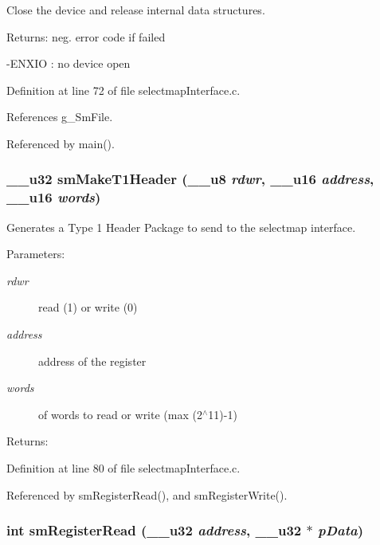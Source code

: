Close the device and release internal data structures. 

\begin{Desc}
\item[Returns:]neg. error code if failed \par
 -ENXIO : no device open \end{Desc}


Definition at line 72 of file selectmap\-Interface.c.

References g\_\-Sm\-File.

Referenced by main().\hypertarget{group__selectmap__access_g88f0784ea00a5707d5fc4db2778e1b2a}{
\subsubsection[smMakeT1Header]{\setlength{\rightskip}{0pt plus 5cm}\_\-\_\-u32 sm\-Make\-T1Header (\_\-\_\-u8 {\em rdwr}, \_\-\_\-u16 {\em address}, \_\-\_\-u16 {\em words})}}
\label{group__selectmap__access_g88f0784ea00a5707d5fc4db2778e1b2a}


Generates a Type 1 Header Package to send to the selectmap interface. 

\begin{Desc}
\item[Parameters:]
\begin{description}
\item[{\em rdwr}]read (1) or write (0) \item[{\em address}]address of the register \item[{\em words}]of words to read or write (max (2$^\wedge$11)-1) \end{description}
\end{Desc}
\begin{Desc}
\item[Returns:]\end{Desc}


Definition at line 80 of file selectmap\-Interface.c.

Referenced by sm\-Register\-Read(), and sm\-Register\-Write().\hypertarget{group__selectmap__access_gf7536588344d4c30f928de00a240baa8}{
\subsubsection[smRegisterRead]{\setlength{\rightskip}{0pt plus 5cm}int sm\-Register\-Read (\_\-\_\-u32 {\em address}, \_\-\_\-u32 $\ast$ {\em p\-Data})}}
\label{group__selectmap__access_gf7536588344d4c30f928de00a240baa8}


